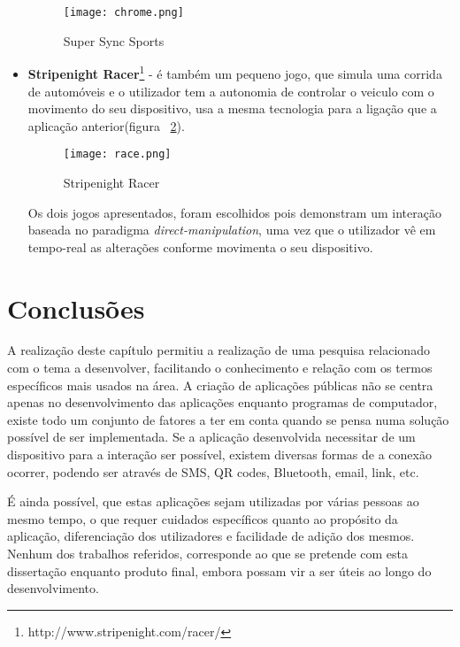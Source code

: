 \begin{itemize}
\begin{figure}[ht]
\centering
\texttt{[image: chrome.png]}
\caption {Super Sync Sports}
\label{fig:chrome}
\end{figure}

\item \textbf{Stripenight Racer}\footnote{http://www.stripenight.com/racer/} - é também um pequeno jogo, que simula uma corrida de automóveis e o utilizador tem a autonomia de controlar o veiculo com o movimento do seu dispositivo, usa a mesma tecnologia para a ligação que a aplicação anterior(figura ~\ref{fig:racer}).

\begin{figure}[ht]
\centering
\texttt{[image: race.png]}
\caption {Stripenight Racer}
\label{fig:racer}
\end{figure}

Os dois jogos apresentados, foram escolhidos pois demonstram um interação baseada no paradigma \textit{direct-manipulation}, uma vez que o utilizador vê em tempo-real as alterações conforme movimenta o seu dispositivo.


\end{itemize}

\section{Conclusões}

A realização deste capítulo permitiu a realização de uma pesquisa relacionado com o tema a desenvolver, facilitando o conhecimento e relação com os termos específicos mais usados na área.
A criação de aplicações públicas não se centra apenas no desenvolvimento das aplicações enquanto programas de computador, existe todo um conjunto de fatores a ter em conta quando se pensa numa solução possível de ser implementada.
Se a aplicação desenvolvida necessitar de um dispositivo para a interação ser possível, existem diversas formas de a conexão ocorrer, podendo ser através de SMS, QR codes, Bluetooth, email, link, etc.

É ainda possível, que estas aplicações sejam utilizadas por várias pessoas ao mesmo tempo, o que requer cuidados específicos quanto ao propósito da aplicação, diferenciação dos utilizadores e facilidade de adição dos mesmos.
Nenhum dos trabalhos referidos, corresponde ao que se pretende com esta dissertação enquanto produto final, embora possam vir a ser úteis ao longo do desenvolvimento.


	
